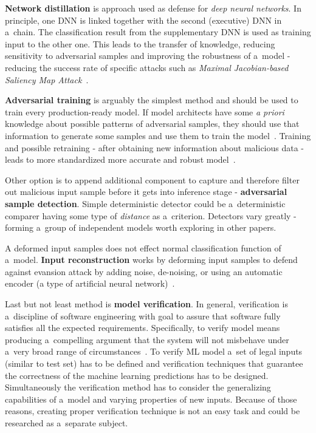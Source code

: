 \textbf{Network distillation} is approach used as defense for \textit{deep neural networks}.
In principle, one DNN is linked together with the second (executive) DNN in a~chain.
The classification result from the supplementary DNN is used as training input to the other one.
This leads to the transfer of knowledge, reducing sensitivity to adversarial samples and improving the robustness of a~model - reducing the success rate of specific attacks such as \textit{Maximal Jacobian-based Saliency Map Attack}~\cite{arxiv:jacobian_attack}.

\textbf{Adversarial training} is arguably the simplest method and should be used to train every production-ready model.
If model architects have some \textit{a priori} knowledge about possible patterns of adversarial samples, they should use that information to generate some samples and use them to train the model~\cite{huawei_security}.
Training and possible retraining - after obtaining new information about malicious data - leads to more standardized more accurate and robust model~\cite{huawei_security}.

Other option is to append additional component to capture and therefore filter out malicious input sample before it gets into inference stage - \textbf{adversarial sample detection}.
Simple deterministic detector could be a~deterministic comparer having some type of \textit{distance} as a~criterion.
Detectors vary greatly - forming a~group of independent models worth exploring in other papers.

A deformed input samples does not effect normal classification function of a~model.
\textbf{Input reconstruction} works by deforming input samples to defend against evansion attack by adding noise, de-noising, or using an automatic encoder (a type of artificial neural network)~\cite{huawei_security}.

Last but not least method is \textbf{model verification}.
In general, verification is a~discipline of software engineering with goal to assure that software fully satisfies all the expected requirements.
Specifically, to verify model means producing a~compelling argument that the system will not misbehave under a~very broad range of circumstances~\cite{blog:model_verification_and_testing}.
To verify ML model a~set of legal inputs (similar to test set) has to be defined and verification techniques that guarantee the correctness of the machine learning predictions has to be designed.
Simultaneously the verification method has to consider the generalizing capabilities of a~model and varying properties of new inputs.
Because of those reasons, creating proper verification technique is not an easy task and could be researched as a~separate subject.


